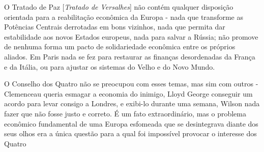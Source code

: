 \begin{citacao}
O Tratado de Paz [\textit{Tratado de Versalhes}] não contém qualquer disposição orientada para a reabilitação econômica da Europa - nada que transforme as Potências Centrais derrotadas em bons vizinhos, nada que permita dar estabilidade aos novos Estados europeus, nada para salvar a Rússia; não promove de nenhuma forma um pacto de solidariedade econômica entre os próprios aliados. Em Paris nada se fez para restaurar as finanças desordenadas da França e da Itália, ou para ajustar os sistemas do Velho e do Novo Mundo.

O Conselho dos Quatro não se preocupou com esses temas, mas sim com outros - Clemenceau queria esmagar a economia do inimigo, Lloyd George conseguir um acordo para levar consigo a Londres, e exibi-lo durante uma semana, Wilson nada fazer que não fosse justo e correto. É um fato extraordinário, mas o problema econômico fundamental de uma Europa esfomeada que se desintegrava diante dos seus olhos era a única questão para a qual foi impossível provocar o interesse dos Quatro \cite[p.~157]{keynes_paz_2002}
\end{citacao}

